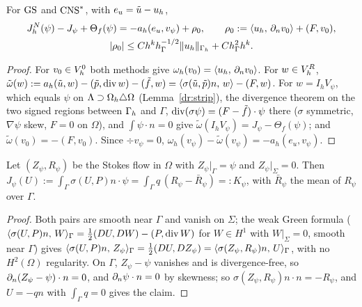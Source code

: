 \begin{lemma}\label{dr:id}
For $\mathrm{GS}$ and $\mathrm{CNS}^\ast$, with $e_u=\tilde u-u_h$,
\begin{gather*}
J^N_h(\psi)-J_\psi+\Theta_f(\psi)=-a_h(e_u,v_\psi)+\rho_0,\qquad\rho_0:=\langle u_h,\, \partial_n v_0\rangle+(F,v_0),\\
|\rho_0|\le Ch^kh_\Gamma^{-1/2}\lVert u_h\rVert_{\Gamma_h}+Ch_\Gamma^2h^k .
\end{gather*}
\end{lemma}
\begin{proof}
For $v_0\in V_h^0$ both methods give $\omega_h(v_0)=\langle u_h,\, \partial_n v_0\rangle$. For $w\in V_h^R$, $\tilde\omega(w):=a_h(\tilde u,w)-(\tilde p,\operatorname{div} w)-(\tilde f,w)=\langle \sigma(\tilde u,\tilde p)n,\, w\rangle-(F,w)$. For $w=I_hV_\psi$, which equals $\psi$ on $\Lambda\supset\Omega_h\triangle\Omega$ (Lemma~\ref{dr:strip}), the divergence theorem on the two signed regions between $\Gamma_h$ and $\Gamma$, $\operatorname{div}(\sigma\psi)=(F-\tilde f)\cdot\psi$ there ($\sigma$ symmetric, $\nabla\psi$ skew, $F=0$ on $\Omega$), and $\int\psi\cdot n=0$ give $\tilde\omega(I_hV_\psi)=J_\psi-\Theta_f(\psi)$; and $\tilde\omega(v_0)=-(F,v_0)$. Since $\div v_\psi=0$, $\omega_h(v_\psi)-\tilde\omega(v_\psi)=-a_h(e_u,v_\psi)$.
\end{proof}

\begin{lemma}[Reciprocity]\label{dr:recip}
Let $(Z_\psi,R_\psi)$ be the Stokes flow in $\Omega$ with $Z_\psi|_\Gamma=\psi$ and $Z_\psi|_\Sigma=0$. Then $J_\psi(U):=\int_\Gamma\sigma(U,P)n\cdot\psi=\int_\Gamma q\,(R_\psi-\bar R_\psi)=:K_\psi$, with $\bar R_\psi$ the mean of $R_\psi$ over $\Gamma$.
\end{lemma}
\begin{proof}
Both pairs are smooth near $\Gamma$ and vanish on $\Sigma$; the weak Green formula ($\langle \sigma(U,P)n,\, W\rangle_\Gamma=\frac12(DU,DW)-(P,\operatorname{div} W)$ for $W\in H^1$ with $W|_\Sigma=0$, smooth near $\Gamma$) gives $\langle \sigma(U,P)n,\, Z_\psi\rangle_\Gamma=\frac12(DU,DZ_\psi)=\langle \sigma(Z_\psi,R_\psi)n,\, U\rangle_\Gamma$, with no $H^2(\Omega)$ regularity. On $\Gamma$, $Z_\psi-\psi$ vanishes and is divergence-free, so $\partial_n(Z_\psi-\psi)\cdot n=0$, and $\partial_n\psi\cdot n=0$ by skewness; so $\sigma(Z_\psi,R_\psi)n\cdot n=-R_\psi$, and $U=-qn$ with $\int_\Gamma q=0$ gives the claim.
\end{proof}

